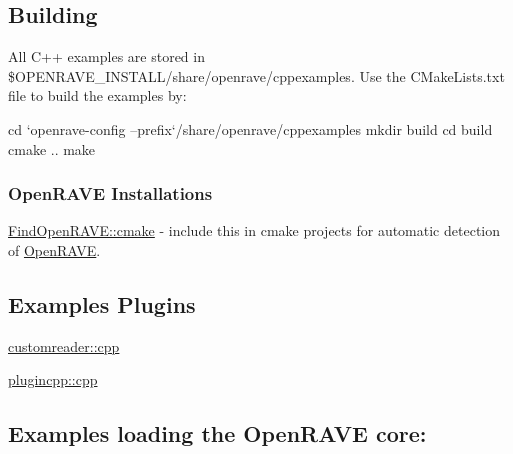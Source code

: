 \hypertarget{cpp__examples_cpp_examples_build}{}\subsection{Building}\label{cpp__examples_cpp_examples_build}
All C++ examples are stored in {\ttfamily \$OPENRAVE\_\-INSTALL/share/openrave/cppexamples}. Use the {\ttfamily CMakeLists.txt} file to build the examples by: \begin{DoxyVerb}
cd `openrave-config --prefix`/share/openrave/cppexamples
mkdir build
cd build
cmake ..
make
\end{DoxyVerb}
\hypertarget{cpp__examples_Detecting}{}\subsubsection{OpenRAVE Installations}\label{cpp__examples_Detecting}

\begin{DoxyItemize}
\item \hyperlink{FindOpenRAVE.cmake-example}{FindOpenRAVE::cmake} -\/ include this in cmake projects for automatic detection of \hyperlink{namespaceOpenRAVE}{OpenRAVE}.
\end{DoxyItemize}\hypertarget{cpp__examples_cpp_examples_plugins}{}\subsection{Examples Plugins}\label{cpp__examples_cpp_examples_plugins}

\begin{DoxyItemize}
\item \hyperlink{customreader.cpp-example}{customreader::cpp}
\item \hyperlink{plugincpp.cpp-example}{plugincpp::cpp}
\end{DoxyItemize}\hypertarget{cpp__examples_cpp_examples_programs}{}\subsection{Examples loading the OpenRAVE core:}\label{cpp__examples_cpp_examples_programs}


